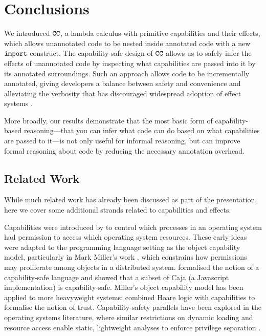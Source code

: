 \vspace{-0.6cm}
\section{Conclusions}
\vspace{-0.4cm}

We introduced $\mathtt{CC}$, a lambda calculus with primitive capabilities and their effects, which allows unannotated code to be nested inside annotated code with a new $\mathtt{import}$ construct. The capability-safe design of $\mathtt{CC}$ allows us to safely infer the effects of unannotated code by inspecting what capabilities are passed into it by its annotated surroundings. Such an approach allows code to be incrementally annotated, giving developers a balance between safety and convenience and alleviating the verbosity that has discouraged widespread adoption of effect systems \cite{rytz12}.

More broadly, our results demonstrate that the most basic form of capability-based reasoning---that you can infer what code can do based on what capabilities are passed to it---is not only useful for informal reasoning, but can improve formal reasoning about code by reducing the necessary annotation overhead.

\vspace{-0.6cm}
\subsection{Related Work}
\vspace{-0.4cm}

While much related work has already been discussed as part of the presentation, here we cover some additional strands related to capabilities and effects.

Capabilities were introduced by \cite{dennis66} to control which processes in an operating system had permission to access which operating system resources.
These early ideas were adapted to the programming language setting as the object capability model, particularly in Mark Miller's work \cite{miller06}, which constrains how permissions may proliferate among objects in a distributed system.
\cite{maffeis10} formalised the notion of a capability-safe language and showed that a subset of Caja (a Javascript implementation) is capability-safe.
Miller's object capability model has been applied to more heavyweight systems:
 \cite{drossopoulou07} combined Hoare logic with capabilities to formalise the
 notion of trust. Capability-safety parallels have been explored in the operating
 systems literature, where similar restrictions on dynamic loading and resource
 access \cite{hunt07} enable static, lightweight analyses to enforce privilege
  separation \cite{madhavapeddy13}.

